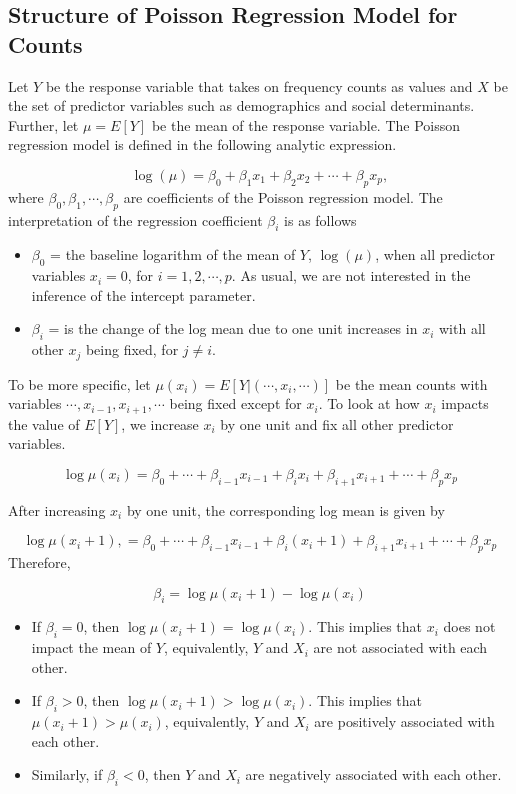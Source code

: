 \documentclass[
]{book}
\begin{document}
\hypertarget{structure-of-poisson-regression-model-for-counts}{%
\subsection{Structure of Poisson Regression Model for Counts}\label{structure-of-poisson-regression-model-for-counts}}

Let \(Y\) be the response variable that takes on frequency counts as values and \(X\) be the set of predictor variables such as demographics and social determinants. Further, let \(\mu=E[Y]\) be the mean of the response variable. The Poisson regression model is defined in the following analytic expression.

\[
\log(\mu) = \beta_0 + \beta_1 x_1 + \beta_2 x_2 + \cdots + \beta_p x_p,
\] where \(\beta_0, \beta_1, \cdots, \beta_p\) are coefficients of the Poisson regression model. The interpretation of the regression coefficient \(\beta_i\) is as follows

\begin{itemize}
\item
  \(\beta_0\) = the baseline logarithm of the mean of \(Y\), \(\log(\mu)\), when all predictor variables \(x_i = 0\), for \(i = 1, 2, \cdots, p\). As usual, we are not interested in the inference of the intercept parameter.
\item
  \(\beta_i\) = is the change of the log mean due to one unit increases in \(x_i\) with all other \(x_j\) being fixed, for \(j\ne i\).
\end{itemize}

To be more specific, let \(\mu(x_i) = E[Y|(\cdots,x_i,\cdots)]\) be the mean counts with variables \(\cdots, x_{i-1}, x_{i+1}, \cdots\) being fixed except for \(x_i\). To look at how \(x_i\) impacts the value of \(E[Y]\), we increase \(x_i\) by one unit and fix all other predictor variables.

\[
\log \mu(x_i) =  \beta_0 + \cdots + \beta_{i-1} x_{i-1}+ \beta_{i} x_{i} + \beta_{i+1} x_{i+1} + \cdots + \beta_p x_p
\]

After increasing \(x_i\) by one unit, the corresponding log mean is given by

\[
\log \mu(x_i+1), = \beta_0 + \cdots + \beta_{i-1} x_{i-1}+ \beta_{i} (x_{i}+1) + \beta_{i+1} x_{i+1} + \cdots + \beta_p x_p
\] Therefore,

\[
\beta_i = \log\mu(x_i+1)  - \log\mu(x_i)
\]

\begin{itemize}
\item
  If \(\beta_i = 0\), then \(\log\mu(x_i+1) = \log\mu(x_i)\). This implies that \(x_i\) does not impact the mean of \(Y\), equivalently, \(Y\) and \(X_i\) are not associated with each other.
\item
  If \(\beta_i > 0\), then \(\log\mu(x_i+1) > \log\mu(x_i)\). This implies that \(\mu(x_i+1) > \mu(x_i)\), equivalently, \(Y\) and \(X_i\) are positively associated with each other.
\item
  Similarly, if \(\beta_i < 0\), then \(Y\) and \(X_i\) are negatively associated with each other.
\end{itemize}
\end{document}
